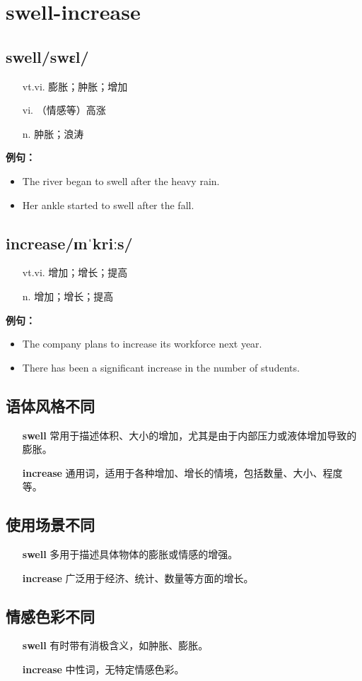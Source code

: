 \documentclass[12pt]{article}
\begin{document}
\section*{swell-increase}
\begin{multicols}{2}
\subsection*{\textbf{swell}\quad/swɛl/}
\begin{itemize}[leftmargin=2em]
\item[vt.vi.] 膨胀；肿胀；增加
\item[vi.] （情感等）高涨
\item[n.] 肿胀；浪涛
\end{itemize}
\textbf{例句：}
\begin{itemize}[leftmargin=2em]
\item The river began to swell after the heavy rain.
\item Her ankle started to swell after the fall.
\end{itemize}
\subsection*{\textbf{increase}\quad/ɪnˈkriːs/}
\begin{itemize}[leftmargin=2em]
\item[vt.vi.] 增加；增长；提高
\item[n.] 增加；增长；提高
\end{itemize}
\textbf{例句：}
\begin{itemize}[leftmargin=2em]
\item The company plans to increase its workforce next year.
\item There has been a significant increase in the number of students.
\end{itemize}
\end{multicols}
\subsection*{语体风格不同}
\begin{itemize}
\item[\textbf{swell}] 常用于描述体积、大小的增加，尤其是由于内部压力或液体增加导致的膨胀。
\item[\textbf{increase}] 通用词，适用于各种增加、增长的情境，包括数量、大小、程度等。
\end{itemize}
\subsection*{使用场景不同}
\begin{itemize}
\item[\textbf{swell}] 多用于描述具体物体的膨胀或情感的增强。
\item[\textbf{increase}] 广泛用于经济、统计、数量等方面的增长。
\end{itemize}
\subsection*{情感色彩不同}
\begin{itemize}
\item[\textbf{swell}] 有时带有消极含义，如肿胀、膨胀。
\item[\textbf{increase}] 中性词，无特定情感色彩。
\end{itemize}
\end{document}
